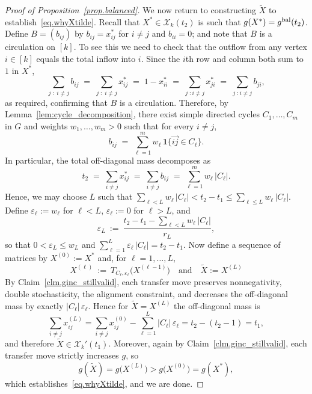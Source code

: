 \documentclass[a4paper,UKenglish,cleveref, autoref, thm-restate,numberwithinsect]{lipics-v2021}
\newcommand{\cX}{\mathcal{X}}
\begin{document}
\begin{proof}[Proof of Proposition~\ref{prop.balanced}]
We now return to constructing $\widetilde{X}$ to establish~\eqref{eq.whyXtilde}. Recall that $X^*\in\cX_k(t_2)$ is such that $g(X^*)=g^{\rm bal}(t_2)$.
Define $B=(b_{ij})$ by $b_{ij}=x^*_{ij}$ for $i\neq j$ and $b_{ii}=0$; and note that $B$ is a circulation on $[k]$. To see this we need to check that the outflow from any vertex $i\in[k]$ equals the total inflow into $i$. Since the $i$th row and column both sum to $1$ in $X^*$,
\[
\sum_{j\; : \; i\neq j} b_{ij}
\;=\;
\sum_{j\; : \; i\neq j} x^*_{ij}
\;=\;
1-x^*_{ii}
\;=\;
\sum_{j\; :i \neq j} x^*_{ji}
\;=\;
\sum_{j\; :i \neq j} b_{ji},
\]
as required, confirming that $B$ is a circulation. 
%
%
Therefore, by Lemma~\ref{lem:cycle_decomposition}, there exist simple directed cycles $C_1,\dots,C_m$ in $G$
and weights $w_1,\dots,w_m>0$ such that for every $i\neq j$,
\[
b_{ij} \;=\; \sum_{\ell=1}^m w_\ell\,\mathbf{1}\{\vec{ij}\in C_\ell\}.
\]
In particular, the total off-diagonal mass decomposes as
\begin{equation}
\label{eq:cycle_capacity_sum}
t_2 \;=\; \sum_{i\neq j} x^*_{ij}
\;=\; \sum_{i\neq j} b_{ij}
\;=\; \sum_{\ell=1}^m w_\ell \, |C_\ell|.
\end{equation}
%
%
%
Hence, we may choose $L$ such that $\sum_{\ell< L} w_\ell \, |C_\ell| < t_2 - t_1 \le \sum_{\ell\le L}  w_\ell \, | C_\ell|$.
Define $\varepsilon_\ell:=w_\ell$ for $\ell<L$, $\varepsilon_\ell:=0$ for $\ell>L$, and
\[
\varepsilon_L \ :=\ \frac{t_2 - t_1 - \sum_{\ell< L} w_\ell \, |C_\ell| }{r_L},
\]
so that $0<\varepsilon_L\le w_L$ and $\sum_{\ell=1}^L  \varepsilon_\ell \, |C_\ell| =t_2 - t_1$.
%
Now define a sequence of matrices by $X^{(0)}:=X^*$ and, for $\ell=1,\dots,L$,
\[
X^{(\ell)}\ :=\ T_{C_\ell,\varepsilon_\ell}\big(X^{(\ell-1)}\big) \quad\mbox{and}\quad \widetilde{X}:=X^{(L)}
\]
By Claim~\ref{clm.ginc_stillvalid}, each transfer move preserves nonnegativity, double stochasticity, the alignment constraint,
and decreases the off-diagonal mass by exactly $|C_\ell|\, \varepsilon_\ell$. Hence for $\widetilde{X}=X^{(L)}$ the off-diagonal mass is
\[
\sum_{i\neq j} x^{(L)}_{ij}
=
\sum_{i\neq j} x^{(0)}_{ij} - \sum_{\ell=1}^L |C_\ell|\, \varepsilon_\ell
=
t_2-(t_2-1)
=
t_1,
\]
and therefore $\widetilde X\in \cX_k'(t_1)$.
%
Moreover, again by Claim~\ref{clm.ginc_stillvalid}, each transfer move strictly increases $g$, so
\[
g(\widetilde X)
=
g\big(X^{(L)}\big)
>
g\big(X^{(0)}\big)
=
g(X^*),
\]
which establishes~\eqref{eq.whyXtilde}, and we are done.
\end{proof}
\end{document}
